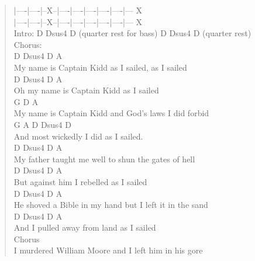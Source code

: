 \documentclass[11pt]{article}
\begin{document}
\begin{verse}
\hspace*{8em}|----|----|--X--|----|----|----|----|----|---   X\\
\hspace*{8em}|----|----|--X--|----|----|----|----|----|---   X\\
\vspace*{1em}
Intro:  D Dsus4 D (quarter rest for bass) D Dsus4 D (quarter rest)\\
\vspace*{1em}
Chorus:\\
\hspace*{3em}D       Dsus4   D                      A\\
My name is Captain Kidd as I sailed, as I sailed\\
\hspace*{6em}D       Dsus4   D          A\\
Oh my name is Captain Kidd as I sailed\\
\hspace*{3em}G                        D                 A\\
My name is Captain Kidd and God's laws I did forbid\\
\hspace*{9em}G          A           D Dsus4 D\\
And most wickedly I did as I sailed.\\
\vspace*{1em}
\hspace*{3em}D      Dsus4      D                        A\\
My father taught me well to shun the gates of hell\\
\hspace*{4em}D         Dsus4 D           A\\
But against him I rebelled as I sailed\\
\hspace*{12em}D      Dsus4  D                       A\\
He shoved a Bible in my hand but I left it in the sand\\
\hspace*{6em}D     Dsus4      D            A\\
And I pulled away from land as I sailed\\
\vspace*{1em}
Chorus\\
\vspace*{1em}
I murdered William Moore and I left him in his gore\\

\end{verse}
\end{document}
